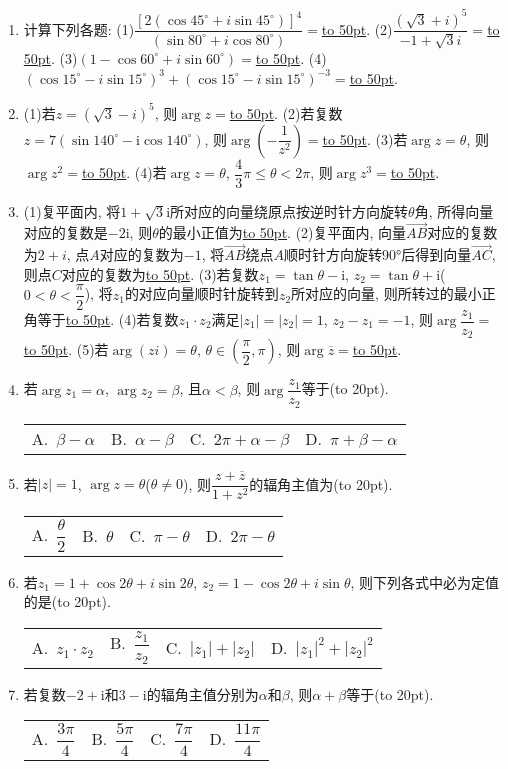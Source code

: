 \documentclass[10pt,a4paper]{article}
\newcommand{\blank}[1]{\underline{\hbox to #1pt{}}}
\newcommand{\bracket}[1]{(\hbox to #1pt{})}
\newcommand{\fourch}[4]{\par\begin{tabular}{p{.23\textwidth}p{.23\textwidth}p{.23\textwidth}p{.23\textwidth}}
A.~#1 &B.~#2& C.~#3& D.~#4
\end{tabular}}
\begin{document}
\begin{enumerate}[1.]
(2)$(\cos 1^\circ +i\sin 1^\circ)(\cos 2^\circ +i\sin 2^\circ)(\cos 3^\circ +i\sin 3^\circ)\cdots (\cos 359^\circ +i\sin 359^\circ)=$\blank{50}.
(3)若$\dfrac{\sin A+i\cos A}{(\sin B+i\cos B)(\sin C+i\cos C)}$是纯虚数, 则$\triangle ABC$是\blank{50}三角形.
\item 计算下列各题:
(1)$\dfrac{{{[2(\cos 45^\circ +i\sin 45^\circ)]}^4}}{(\sin 80^\circ +i\cos 80^\circ)}=$\blank{50}.
(2)$\dfrac{{{(\sqrt 3+i)}^5}}{-1+\sqrt 3i}=$\blank{50}.
(3)$(1-\cos 60^{\circ }+i\sin 60^{\circ })=$\blank{50}.
(4)$(\cos 15^\circ -i\sin 15^\circ)^3+(\cos 15^\circ -i\sin 15^\circ)^{-3}=$\blank{50}.
\item (1)若$z=(\sqrt 3-i)^5$, 则$\arg z=$\blank{50}.
(2)若复数$z=7(\sin 140^\circ -\mathrm{i}\cos 140^\circ)$, 则$\arg (-\dfrac 1{z^2})=$\blank{50}.
(3)若$\arg z=\theta$, 则$\arg z^2=$\blank{50}.
(4)若$\arg z=\theta$, $\dfrac 43\pi \le \theta <2\pi$, 则$\arg z^3=$\blank{50}.
\item (1)复平面内, 将$1+\sqrt 3\mathrm{i}$所对应的向量绕原点按逆时针方向旋转$\theta$角, 所得向量对应的复数是$-2\mathrm{i}$, 则$\theta$的最小正值为\blank{50}.
(2)复平面内, 向量$\overrightarrow{AB}$对应的复数为$2+i$, 点$A$对应的复数为$-1$, 将$\overrightarrow{AB}$绕点$A$顺时针方向旋转90°后得到向量$\overrightarrow{AC}$, 则点$C$对应的复数为\blank{50}.
(3)若复数$z_1=\tan \theta -\mathrm{i}$, $z_2=\tan \theta +\mathrm{i}$($0<\theta <\dfrac{\pi }2$), 将$z_1$的对应向量顺时针旋转到$z_2$所对应的向量, 则所转过的最小正角等于\blank{50}.
(4)若复数$z_1\cdot z_2$满足$|z_1|=|z_2|=1$, $z_2-z_1=-1$, 则$\arg \dfrac{z_1}{z_2}=$\blank{50}.
(5)若$\arg (zi)=\theta$, $\theta \in (\dfrac{\pi }2,\pi)$, 则$\arg \overline z=$\blank{50}.
\item 若$\arg z_1=\alpha$, $\arg z_2=\beta$, 且$\alpha <\beta$, 则$\arg \dfrac{z_1}{z_2}$等于\bracket{20}.
\fourch{$\beta -\alpha$}{$\alpha -\beta$}{$2\pi +\alpha -\beta$}{$\pi +\beta -\alpha$}
\item 若$|z|=1$, $\arg z=\theta$($\theta \ne 0$), 则$\dfrac{z+\overline z}{1+{z^2}}$的辐角主值为\bracket{20}.
\fourch{$\dfrac{\theta }2$}{$\theta$}{$\pi -\theta$}{$2\pi -\theta$}
\item 若$z_1=1+\cos 2\theta +i\sin 2\theta$, $z_2=1-\cos 2\theta +i\sin \theta$, 则下列各式中必为定值的是\bracket{20}.
\fourch{$z_1\cdot z_2$}{$\dfrac{z_1}{z_2}$}{$|z_1|+|z_2|$}{$|z_1|^2+|z_2|^2$}
\item 若复数$-2+\mathrm{i}$和$3-\mathrm{i}$的辐角主值分别为$\alpha$和$\beta$, 则$\alpha +\beta$等于\bracket{20}.
\fourch{$\dfrac{3\pi }4$}{$\dfrac{5\pi }4$}{$\dfrac{7\pi }4$}{$\dfrac{11\pi }4$}

\end{enumerate}
\end{document}

